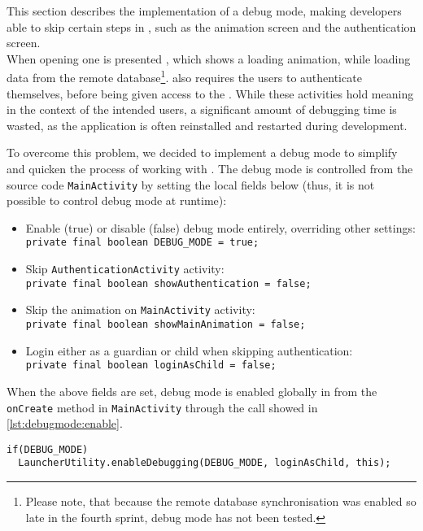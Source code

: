 This section describes the implementation of a debug mode, making developers able to skip certain steps in \launcher, such as the animation screen and the authentication screen.\\

When opening \launcher one is presented \mainactivity, which shows a loading animation, while loading data from the remote database\footnote{Please note, that because the remote database synchronisation was enabled so late in the fourth sprint, debug mode has not been tested.}.
\launcher also requires the users to authenticate themselves, before being given access to the \homeactivity.
While these activities hold meaning in the context of the intended users, a significant amount of debugging time is wasted, as the application is often reinstalled and restarted during development. 

To overcome this problem, we decided to implement a debug mode to simplify and quicken the process of working with \launcher.
The debug mode is controlled from the source code \lstinline|MainActivity| by setting the local fields below (thus, it is not possible to control debug mode at runtime):

\begin{itemize}
\item Enable (true) or disable (false) debug mode entirely, overriding other settings:\\
\lstinline|private final boolean DEBUG_MODE = true;|
\item Skip \lstinline|AuthenticationActivity| activity:\\
\lstinline|private final boolean showAuthentication = false;|
\item Skip the animation on \lstinline|MainActivity| activity:\\
\lstinline|private final boolean showMainAnimation = false;|
\item Login either as a guardian or child when skipping authentication:\\
\lstinline|private final boolean loginAsChild = false;|
\end{itemize}

When the above fields are set, debug mode is enabled globally in \launcher from the \lstinline|onCreate| method in \lstinline|MainActivity| through the call showed in \cref{lst:debugmode:enable}.

\begin{lstlisting}[caption={Enable debug mode from \lstinline|MainActivity|.},label={lst:debugmode:enable}]  
if(DEBUG_MODE)
  LauncherUtility.enableDebugging(DEBUG_MODE, loginAsChild, this);
\end{lstlisting}

